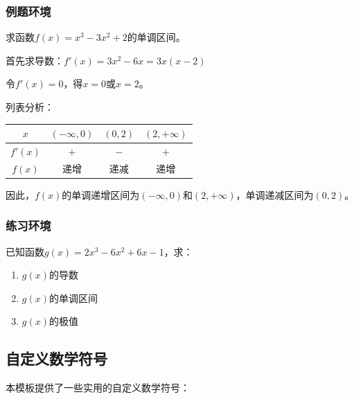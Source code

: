 \documentclass[fancy]{ColorMath} %
\begin{document}
\subsubsection{例题环境}

\begin{example}
    求函数$f(x) = x^3 - 3x^2 + 2$的单调区间。
\end{example}

\begin{solution}
    首先求导数：$f'(x) = 3x^2 - 6x = 3x(x-2)$

    令$f'(x) = 0$，得$x = 0$或$x = 2$。

    列表分析：
    \begin{center}
        \begin{tabular}{|c|c|c|c|}
            \hline
            $x$     & $(-\infty, 0)$ & $(0, 2)$ & $(2, +\infty)$ \\
            \hline
            $f'(x)$ & $+$            & $-$      & $+$            \\
            \hline
            $f(x)$  & 递增             & 递减       & 递增             \\
            \hline
        \end{tabular}
    \end{center}

    因此，$f(x)$的单调递增区间为$(-\infty, 0)$和$(2, +\infty)$，单调递减区间为$(0, 2)$。
\end{solution}

\subsubsection{练习环境}

\begin{exercise}
    已知函数$g(x) = 2x^3 - 6x^2 + 6x - 1$，求：
    \begin{enumerate}
        \item $g(x)$的导数
        \item $g(x)$的单调区间
        \item $g(x)$的极值
    \end{enumerate}
\end{exercise}

\subsection{自定义数学符号}

本模板提供了一些实用的自定义数学符号：
\end{document}
